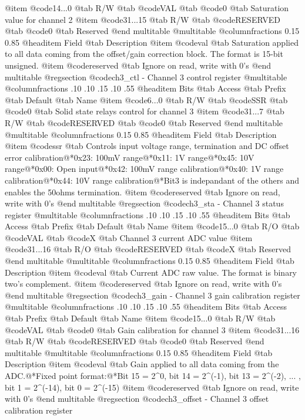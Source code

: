 @item @code{14...0}
@tab R/W @tab
@code{VAL}
@tab @code{0} @tab 
Saturation value for channel 2
@item @code{31...15}
@tab R/W @tab
@code{RESERVED}
@tab @code{0} @tab 
Reserved
@end multitable
@multitable @columnfractions 0.15 0.85
@headitem Field @tab Description
@item @code{val} @tab Saturation applied to all data coming from the offset/gain correction block. The format is 15-bit unsigned.
@item @code{reserved} @tab Ignore on read, write with 0's
@end multitable
@regsection @code{ch3_ctl} - Channel 3 control register
@multitable @columnfractions .10 .10 .15 .10 .55
@headitem Bits @tab Access @tab Prefix @tab Default @tab Name
@item @code{6...0}
@tab R/W @tab
@code{SSR}
@tab @code{0} @tab 
Solid state relays control for channel 3
@item @code{31...7}
@tab R/W @tab
@code{RESERVED}
@tab @code{0} @tab 
Reserved
@end multitable
@multitable @columnfractions 0.15 0.85
@headitem Field @tab Description
@item @code{ssr} @tab Controls input voltage range, termination and DC offset error calibration@*0x23: 100mV range@*0x11: 1V range@*0x45: 10V range@*0x00: Open input@*0x42: 100mV range calibration@*0x40: 1V range calibration@*0x44: 10V range calibration@*Bit3 is indepandant of the others and enables the 50ohms termination.
@item @code{reserved} @tab Ignore on read, write with 0's
@end multitable
@regsection @code{ch3_sta} - Channel 3 status register
@multitable @columnfractions .10 .10 .15 .10 .55
@headitem Bits @tab Access @tab Prefix @tab Default @tab Name
@item @code{15...0}
@tab R/O @tab
@code{VAL}
@tab @code{X} @tab 
Channel 3 current ADC value
@item @code{31...16}
@tab R/O @tab
@code{RESERVED}
@tab @code{X} @tab 
Reserved
@end multitable
@multitable @columnfractions 0.15 0.85
@headitem Field @tab Description
@item @code{val} @tab Current ADC raw value. The format is binary two's complement.
@item @code{reserved} @tab Ignore on read, write with 0's
@end multitable
@regsection @code{ch3_gain} - Channel 3 gain calibration register
@multitable @columnfractions .10 .10 .15 .10 .55
@headitem Bits @tab Access @tab Prefix @tab Default @tab Name
@item @code{15...0}
@tab R/W @tab
@code{VAL}
@tab @code{0} @tab 
Gain calibration for channel 3
@item @code{31...16}
@tab R/W @tab
@code{RESERVED}
@tab @code{0} @tab 
Reserved
@end multitable
@multitable @columnfractions 0.15 0.85
@headitem Field @tab Description
@item @code{val} @tab Gain applied to all data coming from the ADC.@*Fixed point format:@*Bit 15 = 2^0, bit 14 = 2^(-1), bit 13 = 2^(-2), ... , bit 1 = 2^(-14), bit 0 = 2^(-15)
@item @code{reserved} @tab Ignore on read, write with 0's
@end multitable
@regsection @code{ch3_offset} - Channel 3 offset calibration register
